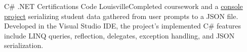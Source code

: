 {C\# .NET}
{Certifications}
{}
{Code Louisville}{Completed coursework and a \href{https://github.com/jacobarchambault/jacobarchambault.codelou.exerciseproject}{console project} serializing student data gathered from user prompts to a JSON file. Developed in the Visual Studio IDE, the project's implemented C\# features include LINQ queries, reflection, delegates, exception handling, and JSON serialization.}
